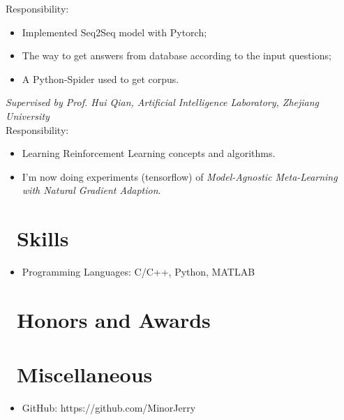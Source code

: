 \documentclass{resume}
\begin{document}
Responsibility: 
\begin{itemize}
  \item Implemented Seq2Seq model with Pytorch;
  \item The way to get answers from database according to the input questions;
  \item A Python-Spider used to get corpus. 
\end{itemize}

\textit{Supervised by Prof. Hui Qian, Artificial Intelligence Laboratory, Zhejiang University}\\
Responsibility: 
\begin{itemize}
  \item Learning Reinforcement Learning concepts and algorithms.
  \item I'm now doing experiments (tensorflow) of \textit{ Model-Agnostic Meta-Learning with Natural Gradient Adaption}.
\end{itemize}


\section{\faCogs\ Skills}
\begin{itemize}[parsep=0.5ex]
  \item Programming Languages: C/C++, Python, MATLAB
\end{itemize}

\section{\faHeartO\ Honors and Awards}
\section{\faInfo\ Miscellaneous}
\begin{itemize}[parsep=0.5ex]
  \item GitHub: https://github.com/MinorJerry
\end{itemize}

%
%
\end{document}
